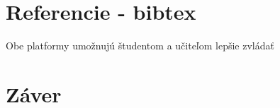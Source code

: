\documentclass[10pt,slovak,a4paper]{article}
\begin{document}



\section{Referencie - bibtex} \label{referencie}
Obe platformy umožnujú študentom a učiteľom lepšie zvládať 

\section{Záver} \label{zaver} %








\end{document}
